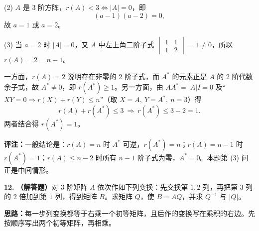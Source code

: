 (2) \(A\) 是 \(3\) 阶方阵，\(r(A)<3\iff |A|=0\)，即
\[
(a-1)(a-2)=0,
\]
故 \(a=1\) 或 \(a=2\)。

(3) 当 \(a=2\) 时 \(|A|=0\)，又 \(A\) 中左上角二阶子式 \(\begin{vmatrix}1&1\\1&2\end{vmatrix}=1\neq0\)，所以 \(r(A)=2=n-1\)。

一方面，\(r(A)=2\) 说明存在非零的 \(2\) 阶子式，而 \(A^*\) 的元素正是 \(A\) 的 \(2\) 阶代数余子式，故 \(A^*\neq 0\)，即 \(r(A^*)\ge 1\)。另一方面，由 \(AA^*=|A|I=0\) 及“\(XY=0\Rightarrow r(X)+r(Y)\le n\)”（取 \(X=A,\ Y=A^*,\ n=3\)）得
\[
r(A)+r(A^*)\le 3\ \Longrightarrow\ r(A^*)\le 3-2=1.
\]
两者结合得 \(r(A^*)=1\)。

\textbf{评注：}一般结论是：\(r(A)=n\) 时 \(A^*\) 可逆，\(r(A^*)=n\)；\(r(A)=n-1\) 时 \(r(A^*)=1\)；\(r(A)\le n-2\) 时所有 \(n-1\) 阶子式为零，\(A^*=0\)。本题第 (3) 问正是中间情形。

\else \answerarea[10] \fi%

\textbf{12.} \textbf{（解答题）}对 \(3\) 阶矩阵 \(A\) 依次作如下列变换：先交换第 \(1,2\) 列，再把第 \(3\) 列的 \(2\) 倍加到第 \(1\) 列，得到矩阵 \(B\)。求矩阵 \(Q\)，使 \(B=AQ\)，并求 \(Q^{-1}\) 与 \(|Q|\)。

\ifshowsolutions%
\textbf{思路：}每一步列变换都等于右乘一个初等矩阵，且后作的变换写在乘积的右边。先按顺序写出两个初等矩阵，再相乘。

